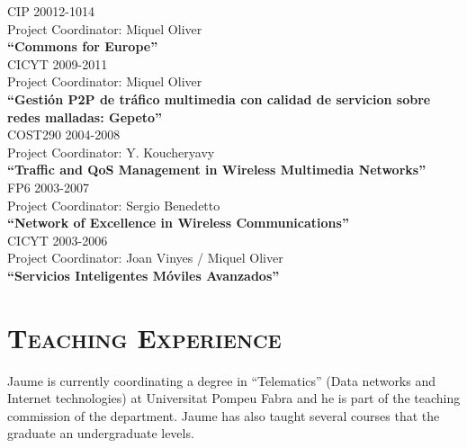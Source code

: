 \documentclass[line,margin]{res}
\begin{document}
\begin{resume}
\hfill {CIP 20012-1014} \\
Project Coordinator: Miquel Oliver\\
\textbf{``Commons for Europe''}\\

\hfill {CICYT 2009-2011} \\
Project Coordinator: Miquel Oliver\\
\textbf{``Gestión P2P de tráfico multimedia con calidad de servicion sobre redes malladas: Gepeto''}\\

\hfill {COST290 2004-2008} \\
Project Coordinator: Y. Koucheryavy\\
\textbf{``Traffic and QoS Management in Wireless Multimedia Networks''}\\

\hfill {FP6 2003-2007} \\
Project Coordinator: Sergio Benedetto\\
\textbf{``Network of Excellence in Wireless Communications''}\\

\hfill {CICYT 2003-2006} \\
Project Coordinator: Joan Vinyes / Miquel Oliver\\
\textbf{``Servicios Inteligentes Móviles Avanzados''}\\

\section{\textsc{Teaching Experience}}
Jaume is currently coordinating a degree in ``Telematics'' (Data networks and Internet technologies) at Universitat Pompeu Fabra and he is part of the teaching commission of the department. Jaume has also taught several courses that the graduate an undergraduate levels.


\end{resume}
\end{document}
